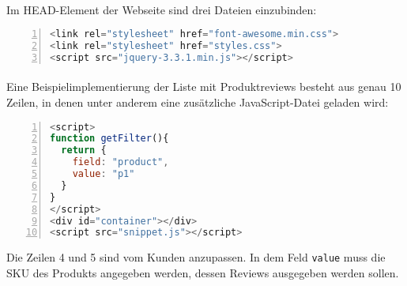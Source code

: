 \documentclass{article}
\begin{document}
\paragraph{}
Im HEAD-Element der Webseite sind drei Dateien einzubinden:
\begin{lstlisting}[language=JavaScript,numbers=left,caption={Verweise im HTML-HEAD},captionpos=b]
<link rel="stylesheet" href="font-awesome.min.css">
<link rel="stylesheet" href="styles.css">
<script src="jquery-3.3.1.min.js"></script>
\end{lstlisting}

\paragraph{}
Eine Beispielimplementierung der Liste mit Produktreviews besteht aus genau 10 Zeilen, in denen unter anderem eine zusätzliche JavaScript-Datei geladen wird:

\begin{lstlisting}[language=JavaScript,numbers=left,caption={Das einzufügende Snippet},captionpos=b]
<script>
function getFilter(){
  return {
    field: "product",
    value: "p1"
  }
}
</script>
<div id="container"></div>
<script src="snippet.js"></script>
\end{lstlisting}

Die Zeilen 4 und 5 sind vom Kunden anzupassen. In dem Feld \texttt{value} muss die SKU des Produkts angegeben werden, dessen Reviews ausgegeben werden sollen.
\end{document}

